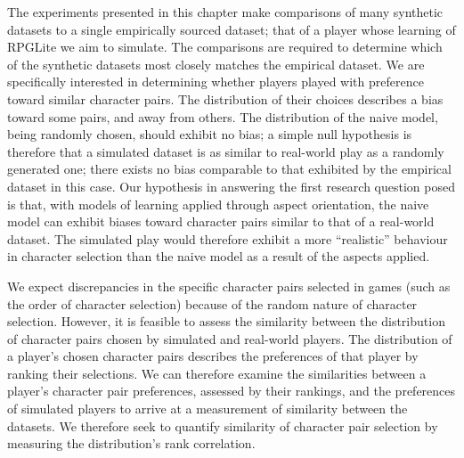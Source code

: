 The experiments presented in this chapter make comparisons of many synthetic datasets to a single
empirically sourced dataset; that of a player whose learning of RPGLite we aim to simulate.
The comparisons are required to determine which of the synthetic datasets most closely matches the
empirical dataset.
We are specifically interested in determining whether players played with preference toward similar
character pairs. The distribution of their choices describes a bias toward some pairs, and away from others.
The distribution of the naive model, being randomly chosen, should exhibit no bias; a simple
null hypothesis is therefore that a simulated dataset is as similar to real-world play as a randomly generated one;
there exists no bias comparable to that exhibited by the empirical dataset in this case. Our hypothesis in answering
the first research question posed is that, with models of learning applied through aspect orientation,
the naive model can exhibit biases toward character pairs similar to that of a real-world dataset.
The simulated play would therefore exhibit a more ``realistic'' behaviour in character selection
than the naive model as a result of the aspects applied.


We expect discrepancies in the specific character pairs selected in
games (such as the order of character selection) because of the random nature of character selection.
However, it is feasible to assess the similarity between
the distribution of character pairs chosen by simulated and real-world players. The distribution
of a player's chosen character pairs describes the preferences of that player by ranking their selections.
We can therefore examine the similarities between a player's character pair preferences, assessed by
their rankings, and the preferences of simulated players to arrive at a measurement of similarity between
the datasets. We therefore seek to quantify similarity of character pair selection by measuring the
distribution's rank correlation.

